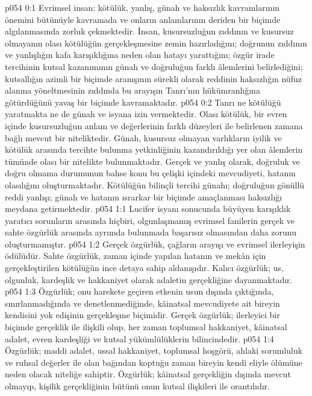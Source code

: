 \vs p054 0:1 Evrimsel insan; kötülük, yanlış, günah ve haksızlık kavramlarının önemini bütünüyle kavramada ve onların anlamlarının deriden bir biçimde algılanmasında zorluk çekmektedir. İnsan, kusursuzluğun zıddının ve kusursuz olmayanın olası kötülüğün gerçekleşmesine zemin hazırladığını; doğrunun zıddının ve yanlışlığın kafa karışıklığına neden olan hatayı yarattığını; özgür irade tercihinin kutsal kazanımının günah ve doğruluğun farklı âlemlerini belirlediğini; kutsallığın azimli bir biçimde aranışının sürekli olarak reddinin haksızlığın nüfuz alanına yöneltmesinin zıddında bu arayışın Tanrı’nın hükümranlığına götürdüğünü yavaş bir biçimde kavramaktadır.
\vs p054 0:2 Tanrı ne kötülüğü yaratmakta ne de günah ve isyana izin vermektedir. Olası kötülük, bir evren içinde kusursuzluğun anlam ve değerlerinin farklı düzeyleri ile belirlenen zamana bağlı mevcut bir niteliktedir. Günah, kusursuz olmayan varlıkların iyilik ve kötülük arasında tercihte bulunma yetkinliğinin kazandırıldığı yer olan âlemlerin tümünde olası bir nitelikte bulunmaktadır. Gerçek ve yanlış olarak, doğruluk ve doğru olmama durumunun bahse konu bu çelişki içindeki mevcudiyeti, hatanın olasılığını oluşturmaktadır. Kötülüğün bilinçli tercihi günahı; doğruluğun gönüllü reddi yanlışı; günah ve hatanın ısrarkar bir biçimde amaçlanması haksızlığı meydana getirmektedir.
\vs p054 1:1 Lucifer isyanı sonucunda büyüyen karışıklık yaratıcı sorunların arasında hiçbiri, olgunlaşmamış evrimsel fanilerin gerçek ve sahte özgürlük arasında ayrımda bulunmada başarısız olmasından daha zorunu oluşturmamıştır.
\vs p054 1:2 Gerçek özgürlük, çağların arayışı ve evrimsel ilerleyişin ödülüdür. Sahte özgürlük, zaman içinde yapılan hatanın ve mekân için gerçekleştirilen kötülüğün ince detaya sahip aldanışıdır. Kalıcı özgürlük; us, olgunluk, kardeşlik ve hakkaniyet olarak adaletin gerçekliğine dayanmaktadır.
\vs p054 1:3 Özgürlük; onu harekete geçiren etkenin usun dışında çıktığında, sınırlanmadığında ve denetlenmediğinde, kâinatsal mevcudiyete ait bireyin kendisini yok edişinin gerçekleşme biçimidir. Gerçek özgürlük; ilerleyici bir biçimde gerçeklik ile ilişkili olup, her zaman toplumsal hakkaniyet, kâinatsal adalet, evren kardeşliği ve kutsal yükümlülüklerin bilincindedir.
\vs p054 1:4 Özgürlük; maddi adalet, ussal hakkaniyet, toplumsal hoşgörü, ahlaki sorumluluk ve ruhsal değerler ile olan bağından koptuğu zaman bireyin kendi eliyle ölümüne neden olacak niteliğe sahiptir. Özgürlük; kâinatsal gerçekliğin dışında mevcut olmayıp, kişilik gerçekliğinin bütünü onun kutsal ilişkileri ile orantılıdır.
